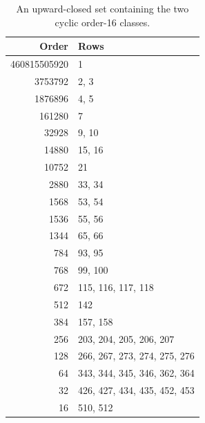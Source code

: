 \begin{table}[ht]\centering
\caption{An upward-closed set containing the two cyclic order-16 classes.}\label{closure}
\begin{tabular}{rl}\toprule Order&Rows\\\midrule
460815505920 & 1\\
3753792 & 2, 3\\
1876896 & 4, 5\\
161280 & 7\\
32928 & 9, 10\\
14880 & 15, 16\\
10752 & 21\\
2880 & 33, 34\\
1568 & 53, 54\\
1536 & 55, 56\\
1344 & 65, 66\\
784 & 93, 95\\
768 & 99, 100\\
672 & 115, 116, 117, 118\\
512 & 142\\
384 & 157, 158\\
256 & 203, 204, 205, 206, 207\\
128 & 266, 267, 273, 274, 275, 276\\
64 & 343, 344, 345, 346, 362, 364\\
32 & 426, 427, 434, 435, 452, 453\\
16 & 510, 512\\
\bottomrule\end{tabular}
\end{table}
